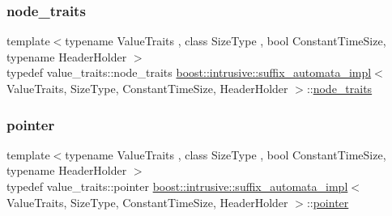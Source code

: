 \mbox{\label{classboost_1_1intrusive_1_1suffix__automata__impl_a3bf4d50a1aa7e13e6d6ded62d04a0296}} 
\subsubsection{\texorpdfstring{node\+\_\+traits}{node\_traits}}
{\footnotesize\ttfamily template$<$typename Value\+Traits , class Size\+Type , bool Constant\+Time\+Size, typename Header\+Holder $>$ \\
typedef value\+\_\+traits\+::node\+\_\+traits \hyperlink{classboost_1_1intrusive_1_1suffix__automata__impl}{boost\+::intrusive\+::suffix\+\_\+automata\+\_\+impl}$<$ Value\+Traits, Size\+Type, Constant\+Time\+Size, Header\+Holder $>$\+::\hyperlink{classboost_1_1intrusive_1_1suffix__automata__impl_a3bf4d50a1aa7e13e6d6ded62d04a0296}{node\+\_\+traits}}

\mbox{\label{classboost_1_1intrusive_1_1suffix__automata__impl_aa30039fa797b95a84660985ab506f6ef}} 
\subsubsection{\texorpdfstring{pointer}{pointer}}
{\footnotesize\ttfamily template$<$typename Value\+Traits , class Size\+Type , bool Constant\+Time\+Size, typename Header\+Holder $>$ \\
typedef value\+\_\+traits\+::pointer \hyperlink{classboost_1_1intrusive_1_1suffix__automata__impl}{boost\+::intrusive\+::suffix\+\_\+automata\+\_\+impl}$<$ Value\+Traits, Size\+Type, Constant\+Time\+Size, Header\+Holder $>$\+::\hyperlink{classboost_1_1intrusive_1_1suffix__automata__impl_aa30039fa797b95a84660985ab506f6ef}{pointer}}

\mbox{\label{classboost_1_1intrusive_1_1suffix__automata__impl_a65352a440751b963521c55774953f0e4}} 
